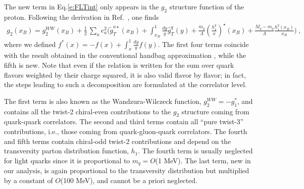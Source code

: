 \documentclass[preprintnumbers,floatfix,nofootinbib]{revtex4}
\newcommand{\xbj}{{x_B}}                   %
\newcommand{\mj}{M_q}
\newcommand{\mq}{m_q}
\begin{document}
The new term in Eq.\eqref{e:FLTint} only appears in the $g_2$ structure function of the proton. Following the derivation in Ref.~\cite{Accardi:2009au}, one finds
\begin{align}
\label{e:g2}
  g_2(\xbj) = g_2^{WW}(\xbj) + \frac{1}{2}\,\sum_a e_a^2
\biggl(
    \widetilde g_T^{a \star}(\xbj) 
    + \int_\xbj^1\frac{dy}{y} \widehat{g}_T^q(y) 
    + \frac{\mq}{\Lambda} \left(\frac{h_1^q}{x}\right)^\star(\xbj) 
    + \frac{\mj-\mq}{\Lambda} \frac{h_1^q(\xbj)}{\xbj} 
\Biggr) \ ,
\end{align}
where we defined $f^*(x) = -f(x) + \int_x^1\frac{dy}{y} f(y)$. The first four
terms coincide with the result obtained in the conventional handbag
approximation \cite{Accardi:2009au}, while the fifth is new. Note that even if
the relation is written for the sum over quark flavors weighted by their charge
squared, it is also valid flavor by flavor; in fact, the steps
leading to such a decomposition are formulated at the correlator level.

The first term is also known as the Wandzura-Wilczeck function, $g_2^{WW} =
-g_1^*$, and contains all the twist-2 chiral-even contributions to
the $g_2$ structure coming from quark-quark correlators. The second and third
terms contain all ``pure twist-3'' contributions, i.e., those coming from
quark-gluon-quark correlators. The fourth and fifth terms contain chiral-odd twist-2 contributions and depend on the
transversity parton distribution function, $h_1$. 
The fourth term is usually neglected for
light quarks since it is proportional to $\mq=O$(1 MeV). The last term,
new in our analysis, is again proportional to the transversity distribution but multiplied by a constant of $O$(100 MeV), and cannot be a priori neglected.
\end{document}
